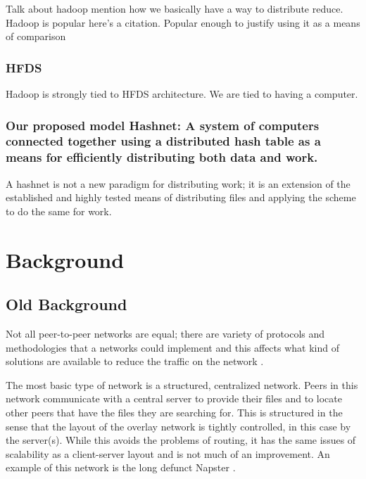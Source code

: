\documentclass[conference, compsocconf, letterpaper]{IEEEtran}
\begin{document}
Talk about hadoop mention how we basically have a way to distribute reduce.
Hadoop is popular here's a citation.  Popular enough to justify using it as a means of comparison

\subsubsection{HFDS}
Hadoop is strongly tied to HFDS architecture.  We are tied to having a computer.

\subsubsection{Our proposed model Hashnet:  A system of computers connected together using a distributed hash table as a means for efficiently distributing both data and work.}

A hashnet is not a new paradigm for distributing work; it is an extension of the established and highly tested means of distributing files and applying the scheme to do the same for work.



\section{Background}


\subsection{Old Background}
Not all peer-to-peer networks are equal; there are variety of protocols and methodologies that a networks could implement and this affects what kind of solutions are available to reduce the traffic on the network    \cite{SurveyCompare} \cite{Overview}.

The most basic type of network is a structured, centralized  network.  Peers in this network communicate with a central server to provide their files and to locate other peers that have the files they are searching for.  This is structured in the sense that the layout of the overlay network is tightly controlled, in this case by the server(s). While this avoids the problems of routing, it has the same issues of scalability as a client-server layout and is not much of an improvement. An example of this network is the long defunct Napster  \cite{SurveyCompare} \cite{Overview}.
\end{document}

